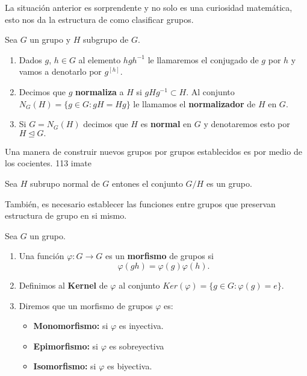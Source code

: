 La situación anterior es sorprendente y no solo es una curiosidad matemática, esto nos da la estructura de como clasificar grupos. 
	
\begin{df}
	Sea $G$ un grupo y $H$ subgrupo de $G$.
	
\begin{enumerate}
    \item Dados $g$, $h \in G$ al elemento $hgh^ {-1}$ le llamaremos el conjugado de $g$ por $h$ y vamos a denotarlo por $g^{[h]}$. 
	\item  Decimos que $g$ \textbf{normaliza} a $H$ si $gHg^{-1} \subset H.$ Al conjunto $N_G(H)=\{g \in G: gH=Hg\}$ le llamamos el \textbf{normalizador } de $H$ en $G$.
	\item Si $G=N_G(H)$ decimos que $H$ es \textbf{normal} en $G$ y denotaremos esto por $H \unlhd G.$
		
\end{enumerate}
\end{df}
	
	Una manera de construir nuevos grupos por grupos establecidos es por medio de los cocientes. 	113 imate
	
	\begin{te}
	Sea $H$ subrupo normal de  $G$ entones el conjunto $G/H$ es un grupo.
	\end{te}
	
	También, es necesario establecer las funciones entre grupos que preservan estructura de grupo en si mismo.
	
\begin{df}
Sea $G$ un grupo. 
	\begin{enumerate}
	\item Una función $\varphi:G \to G$ es un \textbf{morfismo} de grupos si $$\varphi(gh)=\varphi(g) \varphi(h).$$
	\item Definimos al \textbf{Kernel} de $\varphi$ al conjunto $Ker(\varphi)=\{ g \in G: \varphi(g)=e\}$.
	\item Diremos que un morfismo de grupos $\varphi$ es:
	    \begin{itemize}
    	\item \textbf{Monomorfismo:} si $\varphi$ es inyectiva.
    	\item \textbf{Epimorfismo:} si $\varphi$ es sobreyectiva
	    \item \textbf{Isomorfismo:} si $\varphi$ es biyectiva.
    	\end{itemize}
	\end{enumerate}				
\end{df}
	
